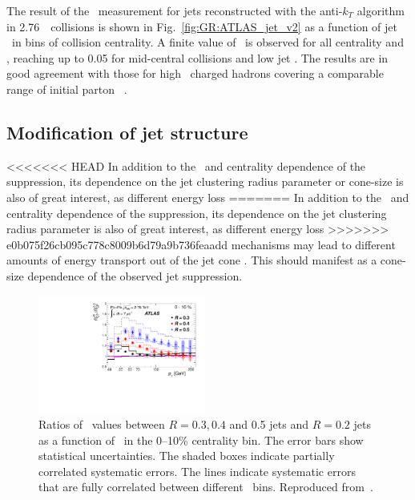 The result of the \vtwo\ measurement for jets reconstructed with the anti-$k_T$
algorithm in 2.76\TeV\ \PbPb\ collisions is shown in Fig.~\ref{fig:GR:ATLAS_jet_v2}
as a function of jet \pT\ in bins of collision centrality. A finite
value of \vtwo\ is observed for all centrality and \pT, reaching up to 0.05 for
mid-central collisions and low jet \pT. The results are in good agreement
with those for high \pT\ charged hadrons covering a comparable range
of initial parton \pT~\cite{Chatrchyan:2012xq}.

\subsection{Modification of jet structure}

<<<<<<< HEAD
In addition to the \pT\ and centrality dependence of the suppression, its dependence on the 
jet clustering radius parameter or cone-size is also of great interest, as different energy loss 
=======
In addition to the \pT\ and centrality dependence of the suppression, its dependence on the
jet clustering radius parameter is also of great interest, as different energy loss
>>>>>>> e0b075f26cb095c778c8009b6d79a9b736feaadd
mechanisms may lead to different amounts of energy transport out of the jet cone
\cite{Vitev:2008rz, Vitev:2009rd,He:2011pd}. This should manifest as a cone-size
dependence of the observed jet suppression.
\begin{figure}[!th]
\begin{center}
\includegraphics[width=0.49\textwidth]{jetfigures/ATLAS_jetRCP_size.pdf}
\caption{
Ratios of \Rcp\ values between $R = 0.3, 0.4$ and 0.5 jets and $R =
0.2$ jets as a function of \pT\ in the 0--10\% centrality bin. The
error bars show statistical uncertainties. The shaded boxes
indicate partially correlated systematic errors. The lines indicate
systematic errors that are fully correlated between different \pT\ bins.
Reproduced from~\cite{Aad:2012is}.
}
\label{fig:GR:ATLAS_jetRCP_size}
\end{center}
\end{figure}

